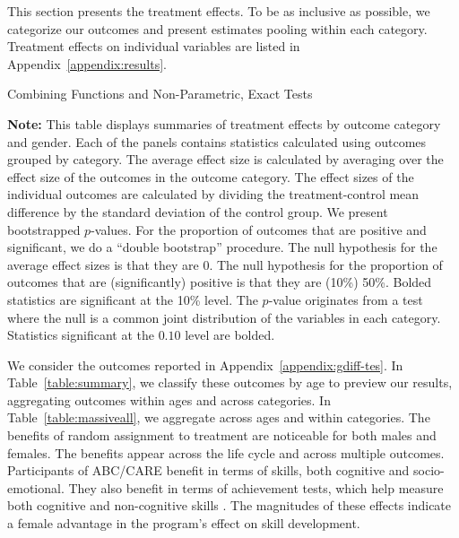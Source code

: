 This section presents the treatment effects. To be as inclusive as possible, we categorize our outcomes and present estimates pooling within each category. Treatment effects on individual variables are listed in Appendix~\ref{appendix:results}.

\begin{table}[!htpb]
\begin{threeparttable}
\caption{Combining Functions and Non-Parametric, Exact Tests} \label{table:massiveall}
\centering
 
\begin{tablenotes}
\footnotesize
\item \textbf{Note:} This table displays summaries of treatment effects by outcome category and gender. Each of the panels contains statistics calculated using outcomes grouped by category. The average effect size is calculated by averaging over the effect size of the outcomes in the outcome category. The effect sizes of the individual outcomes are calculated by dividing the treatment-control mean difference by the standard deviation of the control group. We present bootstrapped $p$-values. For the proportion of outcomes that are positive and significant, we do a ``double bootstrap'' procedure. The null hypothesis for the average effect sizes is that they are 0. The null hypothesis for the proportion of outcomes that are (significantly) positive is that they are (10\%) 50\%. Bolded statistics are significant at the 10\% level. The \citet{Rosenbaum_2005_Distribution_JRSS} $p$-value originates from a test where the null is a common joint distribution of the variables in each category. Statistics significant at the $0.10$ level are bolded.
\end{tablenotes}
\end{threeparttable}
\end{table}

We consider the outcomes reported in Appendix~\ref{appendix:gdiff-tes}. In Table~\ref{table:summary}, we classify these outcomes by age to preview our results, aggregating outcomes within ages and across categories. In Table~\ref{table:massiveall}, we aggregate across ages and within categories. The benefits of random assignment to treatment are noticeable for both males and females. The benefits appear across the life cycle and across multiple outcomes. Participants of ABC/CARE benefit in terms of skills, both cognitive and socio-emotional. They also benefit in terms of achievement tests, which help measure both cognitive and non-cognitive skills \citep{Almlund_Duckworth_etal_2011_ecoval}. The magnitudes of these effects indicate a female advantage in the program's effect on skill development.

